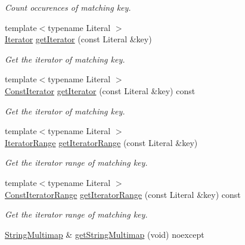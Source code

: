\begin{DoxyCompactItemize}
\begin{DoxyCompactList}\small\item\em Count occurences of matching key. \end{DoxyCompactList}\item 
{\footnotesize template$<$typename Literal $>$ }\\\mbox{\hyperlink{classo_z_1_1_h_t_t_p_1_1_header_a572d529cae124a02fb68df9c3e51c576}{Iterator}} \mbox{\hyperlink{classo_z_1_1_h_t_t_p_1_1_header_ae20764876b35b2185394eafcb007454b}{get\+Iterator}} (const Literal \&key)
\begin{DoxyCompactList}\small\item\em Get the iterator of matching key. \end{DoxyCompactList}\item 
{\footnotesize template$<$typename Literal $>$ }\\\mbox{\hyperlink{classo_z_1_1_h_t_t_p_1_1_header_a509c1ea8f5b221246e6e49c01a115d69}{Const\+Iterator}} \mbox{\hyperlink{classo_z_1_1_h_t_t_p_1_1_header_a43a6b9a03c9a46c4eeee0df3c3990d63}{get\+Iterator}} (const Literal \&key) const
\begin{DoxyCompactList}\small\item\em Get the iterator of matching key. \end{DoxyCompactList}\item 
{\footnotesize template$<$typename Literal $>$ }\\\mbox{\hyperlink{classo_z_1_1_h_t_t_p_1_1_header_a226f04d25adf24d2a683f82ef8327812}{Iterator\+Range}} \mbox{\hyperlink{classo_z_1_1_h_t_t_p_1_1_header_ae30e471f7d522477cf022531a84e727a}{get\+Iterator\+Range}} (const Literal \&key)
\begin{DoxyCompactList}\small\item\em Get the iterator range of matching key. \end{DoxyCompactList}\item 
{\footnotesize template$<$typename Literal $>$ }\\\mbox{\hyperlink{classo_z_1_1_h_t_t_p_1_1_header_a0823c7353e93de315929c96457563c3d}{Const\+Iterator\+Range}} \mbox{\hyperlink{classo_z_1_1_h_t_t_p_1_1_header_acecb2a9ed8e432a4a3ab9c6170d73793}{get\+Iterator\+Range}} (const Literal \&key) const
\begin{DoxyCompactList}\small\item\em Get the iterator range of matching key. \end{DoxyCompactList}\item 
\mbox{\hyperlink{namespaceo_z_1_1_h_t_t_p_a339aac279d709cfa16148ad073500fc1}{String\+Multimap}} \& \mbox{\hyperlink{classo_z_1_1_h_t_t_p_1_1_header_a915a52b181112582d34e0942004d4cb0}{get\+String\+Multimap}} (void) noexcept

\end{DoxyCompactItemize}
